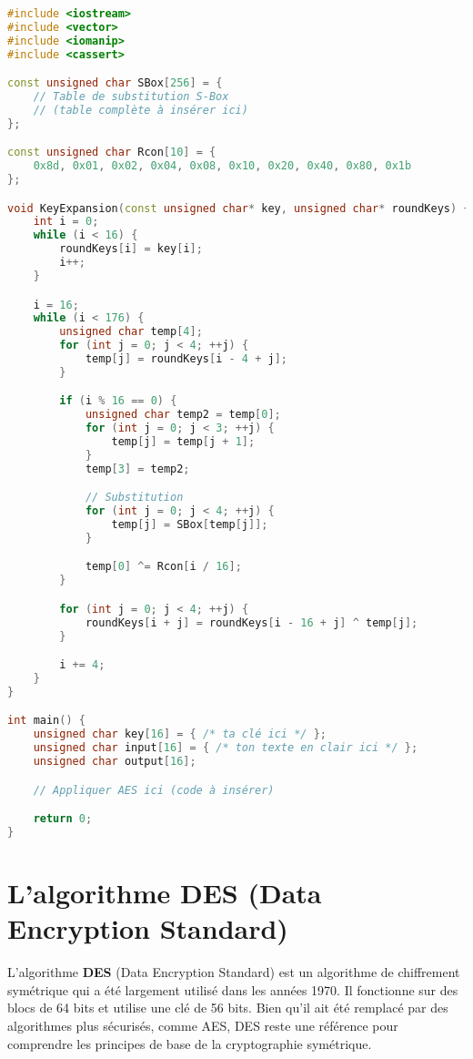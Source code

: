 \documentclass[12pt,a4paper]{article}
\begin{document}
\begin{lstlisting}[language=C++]
#include <iostream>
#include <vector>
#include <iomanip>
#include <cassert>

const unsigned char SBox[256] = {
    // Table de substitution S-Box
    // (table complète à insérer ici)
};

const unsigned char Rcon[10] = {
    0x8d, 0x01, 0x02, 0x04, 0x08, 0x10, 0x20, 0x40, 0x80, 0x1b
};

void KeyExpansion(const unsigned char* key, unsigned char* roundKeys) {
    int i = 0;
    while (i < 16) {
        roundKeys[i] = key[i];
        i++;
    }

    i = 16;
    while (i < 176) {
        unsigned char temp[4];
        for (int j = 0; j < 4; ++j) {
            temp[j] = roundKeys[i - 4 + j];
        }

        if (i % 16 == 0) {
            unsigned char temp2 = temp[0];
            for (int j = 0; j < 3; ++j) {
                temp[j] = temp[j + 1];
            }
            temp[3] = temp2;

            // Substitution
            for (int j = 0; j < 4; ++j) {
                temp[j] = SBox[temp[j]];
            }

            temp[0] ^= Rcon[i / 16];
        }

        for (int j = 0; j < 4; ++j) {
            roundKeys[i + j] = roundKeys[i - 16 + j] ^ temp[j];
        }

        i += 4;
    }
}

int main() {
    unsigned char key[16] = { /* ta clé ici */ };
    unsigned char input[16] = { /* ton texte en clair ici */ };
    unsigned char output[16];

    // Appliquer AES ici (code à insérer)

    return 0;
}
\end{lstlisting}

\newpage

\section{L'algorithme DES (Data Encryption Standard)}
L'algorithme \textbf{DES} (Data Encryption Standard) est un algorithme de chiffrement symétrique qui a été largement utilisé dans les années 1970. Il fonctionne sur des blocs de 64 bits et utilise une clé de 56 bits. Bien qu'il ait été remplacé par des algorithmes plus sécurisés, comme AES, DES reste une référence pour comprendre les principes de base de la cryptographie symétrique.
\end{document}
